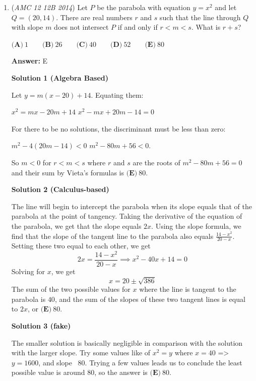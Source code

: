 \begin{enumerate}
 (E)

 


	\item (\textit{AMC 12 12B 2014}) Let $P$ be the parabola with equation $y=x^2$ and let $Q = (20, 14)$. There are real numbers $r$ and $s$ such that the line through $Q$ with slope $m$ does not intersect $P$ if and only if $r < m < s$. What is $r + s$?


 $\textbf{(A)}\ 1\qquad\textbf{(B)}\ 26\qquad\textbf{(C)}\ 40\qquad\textbf{(D)}\ 52\qquad\textbf{(E)}\ 80$

 \textbf{Answer: }E



\textbf{Solution 1 (Algebra Based)}

Let $y = m(x - 20) + 14$. Equating them:

 $x^2 = mx - 20m + 14$
$x^2 - mx + 20m - 14 = 0$

 For there to be no solutions, the discriminant must be less than zero:

 $m^2 - 4(20m - 14) < 0$
$m^2 - 80m + 56 < 0$.

 So $m < 0$ for $r < m < s$ where $r$ and $s$ are the roots of $m^2 - 80m + 56 = 0$ and their sum by Vieta's formulas is $\boxed{\textbf{(E)}\ 80}$.

 



\textbf{Solution 2 (Calculus-based)}

The line will begin to intercept the parabola when its slope equals that of the parabola at the point of tangency.  Taking the derivative of the equation of the parabola, we get that the slope equals $2x$.  Using the slope formula, we find that the slope of the tangent line to the parabola also equals $\frac{14-x^2}{20-x}$.  Setting these two equal to each other, we get
 \[2x = \frac{14-x^2}{20-x} \implies x^2-40x+14 = 0\]Solving for $x$, we get 
 \[x= 20\pm \sqrt{386}\]The sum of the two possible values for $x$ where the line is tangent to the parabola is $40$, and the sum of the slopes of these two tangent lines is equal to $2x$, or $\boxed{\textbf{(E)}\ 80}$.

 



\textbf{Solution 3 (fake)}

The smaller solution is basically negligible in comparison with the solution with the larger slope. Try some values like of $x^2 = y$ where $x = 40$ => $y = 1600$, and slope ~80. Trying a few values leads us to conclude the least possible value is around $80$, so the answer is $\boxed {\textbf{(E)}\ 80}$. 


\end{enumerate}

